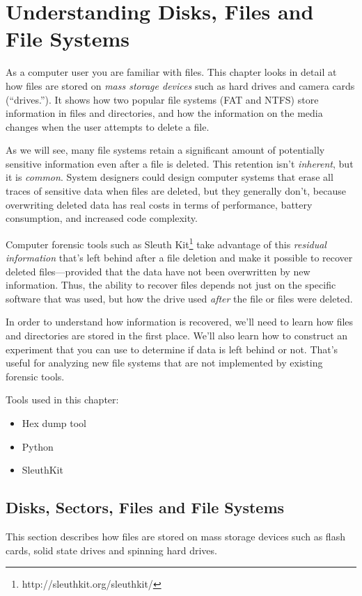 \chapter{Understanding Disks, Files and File Systems}\label{ch-drives}
As a computer user you are familiar with files. This chapter looks in
detail at how files are stored on \emph{mass storage devices} such as
hard drives and camera cards (``drives.''). It shows how two popular file systems
(FAT and NTFS) store information in files and directories, and how the
information on the media changes when the user attempts to delete a
file.

As we will see, many file systems retain a significant amount of
potentially sensitive information even after a file is deleted. This
retention isn't \emph{inherent}, but it is \emph{common}. 
System designers could design computer systems that erase all traces of
sensitive data when files are deleted, but they generally don't, because
overwriting deleted data has real costs in terms of performance,
battery consumption, and increased code complexity.

Computer forensic tools such as Sleuth
Kit\footnote{http://sleuthkit.org/sleuthkit/} take advantage of this
\emph{residual information} that's left behind after a file deletion
and make it possible to recover deleted files---provided that the data
have not been overwritten by new information. Thus, the ability to
recover files depends not just on the specific software that
was used, but how the drive used \emph{after} the file or files were
deleted.   

In order to understand how information is recovered,
we'll need to learn how files and directories are stored in the first
place. We'll also learn how to construct an experiment that you can
use to determine if data is left behind or not. That's useful for
analyzing new file systems that are not implemented by existing
forensic tools.

Tools used in this chapter:
\begin{itemize}
\item Hex dump tool
\item Python
\item SleuthKit 
\end{itemize}

\section{Disks, Sectors, Files and File Systems}
This section describes how files are stored on mass storage devices
such as flash cards, solid state drives and spinning hard drives. 



